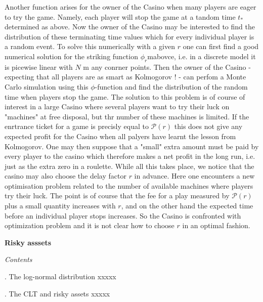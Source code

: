 \documentclass[12pt]{amsart}
\begin{document}
\noindent
Another  function arises for the owner of the Casino when
many players are eager to try the game. Namely, each player will
stop the game at a tandom time
$t_*$ determined as above.
Now the owner of the Casino may  be interested to
find
the distribution of these terminating time values
which for every individual player is a random
event.
To solve this numerically with a given $r$
one can  first
find a good numerical solution for the striking function
$\phi_r$mabovce,   i.e. in a discrete model it is picewise linear with
$N$ m any conrner points. Then the owner of the Casino - expecting that all players
are as smart as Kolmogorov !  - can perfom a Monte  Carlo simulation
using this $\phi$-function and find the 
distribution of the random time when  players  stop the game.
The solution to this
problem is of course of interest  in a large Casino  where several players
want to try their luck on "machines" at free disposal, but thr number of these
machines is limited.
If the enrtrance  ticket for a game is precisly equal to 
$\mathcal P(r)$ this does not give any expected profit for the Casino when 
all palyers have learnt the lesson from Kolmogorov. One may then suppose that a "small" extra amount
must be  paid by every player to the casino which therefore makes a net profit
in the long run,  i.e. just as the extra zero in a roulette.
While all this takes place, we notice that the casino may also
choose the delay factor $r$ in advance.
Here one encounters a new optimisation problem
related to the number of available machines where
players  try their luck. The  point is of
course
that the fee for a play measured by $\mathcal P(r)$ plus a small quantity
increases with $r$, and  on the other hand the
expected time before an individual player stops increases.
So  the Casino is confronted with optimization problem
and it is not clear how
to choose $r$ in an optimal fashion.








\newpage



\centerline{\bf{Risky asssets}}


\bigskip



\centerline{\emph{Contents}}

\bigskip 



. The log-normal distribution
\bigskip 
xxxxx

. The CLT and risky assets
xxxxx
\end{document}

